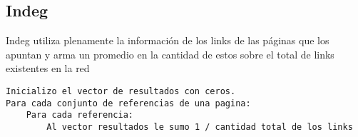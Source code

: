 \subsection{Indeg}

Indeg utiliza plenamente la información de los links de las páginas que los apuntan y arma un promedio en la cantidad de estos sobre el total de links existentes en la red

\begin{lstlisting}[frame=single] 
Inicializo el vector de resultados con ceros.
Para cada conjunto de referencias de una pagina:
	Para cada referencia:
		Al vector resultados le sumo 1 / cantidad total de los links
	
\end{lstlisting}